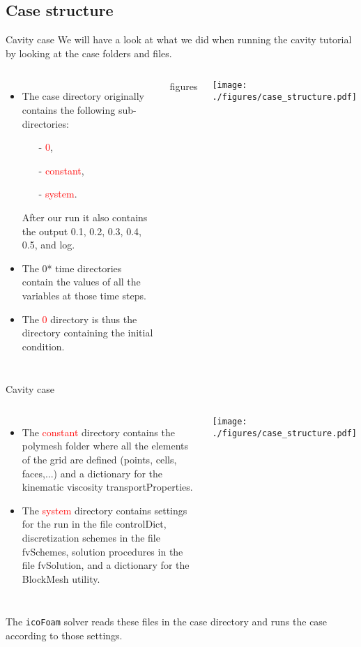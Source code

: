 \documentclass{beamer}
\begin{document}
\subsection{Case structure}

\begin{frame}{Cavity case}
We will have a look at what we did when running the cavity tutorial by looking at the case folders and files.

\begin{columns}[c]

\column{7.7cm} 
\begin{itemize}
\item The case directory originally contains the following sub-directories:
\begin{itemize}
\item[-] \textcolor{red}{0},
\item[-] \textcolor{red}{constant},
\item[-] \textcolor{red}{system}.
\end{itemize}
After our run it also contains the output 0.1, 0.2, 0.3, 0.4, 0.5, and log.
\item The 0* time directories contain the values of all the variables at those time steps. 
\item The \textcolor{red}{0} directory is thus the directory containing the initial condition. 
\end{itemize}
figures
\column{4.0cm} 
\begin{center}\texttt{[image: ./figures/case\_structure.pdf]}\end{center}
\end{columns}


\end{frame}

\begin{frame}{Cavity case}
\vspace{-0.3cm}
\begin{columns}[c]

\column{7.0cm} 
\begin{itemize}
\item The \textcolor{red}{constant} directory contains the polymesh folder where all the elements of the grid are defined (points, cells, faces,...) and a dictionary for the kinematic viscosity transportProperties.
\item The \textcolor{red}{system} directory contains settings for the run in the file controlDict, discretization schemes in the file fvSchemes,
solution procedures in the file fvSolution, and a dictionary for the BlockMesh utility.
\end{itemize}

\column{4.0cm} 
\begin{center}\texttt{[image: ./figures/case\_structure.pdf]}\end{center}
\end{columns}

\vspace{0.3cm}

The \texttt{icoFoam} solver reads these files in the case directory and runs the case
according to those settings.

\end{frame}
\end{document}
